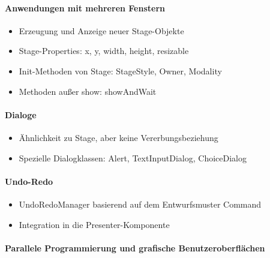 \paragraph*{Anwendungen mit mehreren Fenstern}

\begin{itemize}
\item Erzeugung und Anzeige neuer Stage-Objekte
\item Stage-Properties: x, y, width, height, resizable
\item Init-Methoden von Stage: StageStyle, Owner, Modality
\item Methoden außer show: showAndWait
\end{itemize}

\paragraph*{Dialoge}

\begin{itemize}
    \item Ähnlichkeit zu Stage, aber keine Vererbungsbeziehung
    \item Spezielle Dialogklassen: Alert, TextInputDialog, ChoiceDialog
\end{itemize}

\paragraph*{Undo-Redo}

\begin{itemize}
    \item UndoRedoManager basierend auf dem Entwurfsmuster Command
    \item Integration in die Presenter-Komponente
\end{itemize}

\paragraph*{Parallele Programmierung und grafische Benutzeroberflächen}

